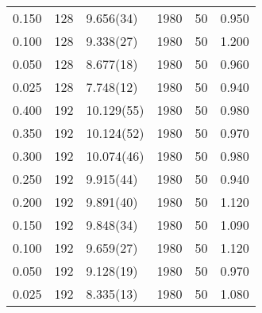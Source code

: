 \begin{tabular}{rrlrrr}
 0.150 &     128 & 9.656(34)  &                 1980 &                   50 &    0.950 \\
 0.100 &     128 & 9.338(27)  &                 1980 &                   50 &    1.200 \\
 0.050 &     128 & 8.677(18)  &                 1980 &                   50 &    0.960 \\
 0.025 &     128 & 7.748(12)  &                 1980 &                   50 &    0.940 \\
 0.400 &     192 & 10.129(55) &                 1980 &                   50 &    0.980 \\
 0.350 &     192 & 10.124(52) &                 1980 &                   50 &    0.970 \\
 0.300 &     192 & 10.074(46) &                 1980 &                   50 &    0.980 \\
 0.250 &     192 & 9.915(44)  &                 1980 &                   50 &    0.940 \\
 0.200 &     192 & 9.891(40)  &                 1980 &                   50 &    1.120 \\
 0.150 &     192 & 9.848(34)  &                 1980 &                   50 &    1.090 \\
 0.100 &     192 & 9.659(27)  &                 1980 &                   50 &    1.120 \\
 0.050 &     192 & 9.128(19)  &                 1980 &                   50 &    0.970 \\
 0.025 &     192 & 8.335(13)  &                 1980 &                   50 &    1.080 \\
\hline
\end{tabular}
